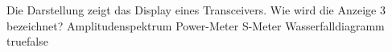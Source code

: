     {Die Darstellung zeigt das Display eines Transceivers. Wie wird die Anzeige 3 bezeichnet?}
    {Amplitudenspektrum}
    {Power-Meter}
    {S-Meter}
    {Wasserfalldiagramm}
    {true}{false}